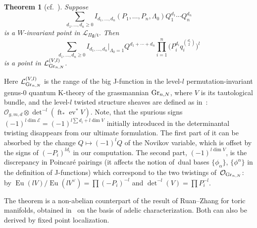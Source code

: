 \documentclass[pdftex]{sigma}
\numberwithin{equation}{section}
\newtheorem{Theorem}{Theorem}[section]
\def\E{\mathcal E}
\def\L{\mathcal L}
\def\O{\mathcal O}
\def\det{\operatorname{det}}
\def\a{\alpha}
\def\ev{\operatorname{ev}}
\def\ft{\operatorname{ft}}
\def\Eu{\operatorname{Eu}}
\begin{document}
\begin{Theorem}[{cf.~\cite{R-Z}}]\label{thm6}
Suppose
\[
\sum_{d_1,\dots,d_n\geq 0}I_{d_1,\dots,d_n}(P_1,\dots,P_n,\Lambda_0) Q_1^{d_1}\cdots Q_n^{d_n}
\]
is a $W$-invariant point in $\L_{\Pi \mathfrak{g}/\mathfrak{t}}$. Then
\[
\sum_{d_1,\dots,d_n\geq 0}I_{d_1,\dots,d_n}|_{\Lambda_0=1}Q^{d_1+\cdots+d_n} \prod_{i=1}^n \Big( P_i^{d_i}q_i^{\binom{d_i}{2}} \Big)^l
\]
is a point in $\L_{{\rm Gr}_{n,N}}^{(V,l)}$.
\end{Theorem}
Here $\L_{{\rm Gr}_{n,N}}^{(V,l)}$ is the range of the big J-function in the level-$l$ permutation-invariant \mbox{genus-0} quantum K-theory of the grassmannian ${\rm Gr}_{n,N}$, where $V$ is its tautological bundle, and the \mbox{level-$l$} twisted structure sheaves are defined as in~\cite{R-Z}: $\O_{g,m,d}\otimes \det^{-l}(\ft_*\ev^*V)$. Note, that the spurious signs $(-1)^{l\dim \E}=(-1)^{l\sum d_i+l\dim V}$ initially introduced in the determinantal twisting disappears from our ultimate formulation. The first part of it can be absorbed by the change $Q\mapsto (-1)^lQ$ of the Novikov variable, which is offset by the signs of $(-P_i)^{ld_i}$ in our computation. The second part, $(-1)^{l\dim V}$, is the discrepancy in Poincar{\'e} pairings (it affects the notion of~dual bases $\{ \phi_{\a}\}$, $\{ \phi^\a \}$ in the definition of J-functions) which correspond to the two twistings of~$\O_{{\rm Gr}_{n,N}}$: by $\Eu(lV)/\Eu(lV^{\vee})=\prod (-P_i)^{-l}$ and $\det^{-l}(V)=\prod P_i^{-l}$.

The theorem is a non-abelian counterpart of the result of Ruan--Zhang for toric manifolds, obtained in~\cite{R-Z} on the basis of adelic characterization. Both can also be derived by fixed point localization.
\end{document}
